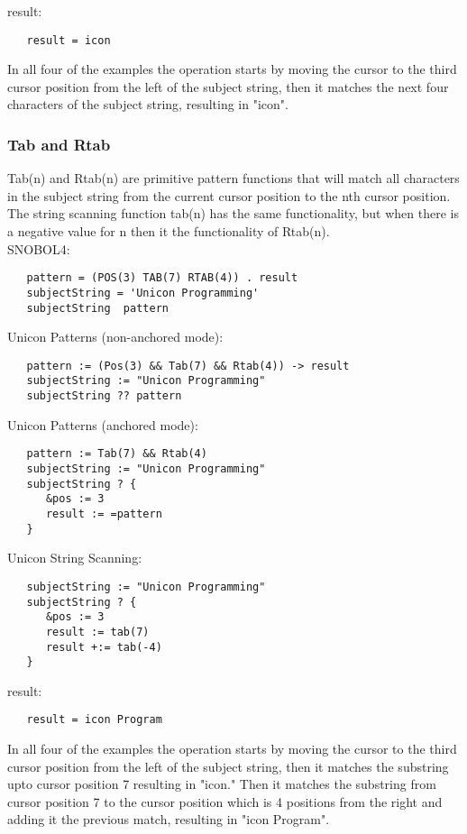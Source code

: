 \documentclass{article}
\begin{document}
\noindent
result:
\begin{verbatim}
   result = icon
\end{verbatim}

In all four of the examples the operation starts by moving the cursor to the third cursor position from the left of the subject string, then it matches the next four characters of the subject string, resulting in "icon".

\vspace{2 pc}
\subsubsection{Tab and Rtab}
Tab(n) and Rtab(n) are primitive pattern functions that will match all characters in the subject string from the current cursor position to the nth cursor position.  The string scanning function tab(n) has the same functionality, but when there is a negative value for n then it the functionality of Rtab(n).\\

\noindent
SNOBOL4:
\begin{verbatim}
   pattern = (POS(3) TAB(7) RTAB(4)) . result
   subjectString = 'Unicon Programming'
   subjectString  pattern
\end{verbatim}

\noindent
Unicon Patterns (non-anchored mode):
\begin{verbatim}
   pattern := (Pos(3) && Tab(7) && Rtab(4)) -> result
   subjectString := "Unicon Programming"
   subjectString ?? pattern
\end{verbatim}
\noindent
Unicon Patterns (anchored mode):
\begin{verbatim}
   pattern := Tab(7) && Rtab(4)
   subjectString := "Unicon Programming"
   subjectString ? {
      &pos := 3
      result := =pattern
   }
\end{verbatim}

\noindent
Unicon String Scanning:
\begin{verbatim}
   subjectString := "Unicon Programming"
   subjectString ? {
      &pos := 3
      result := tab(7)
      result +:= tab(-4)
   }
\end{verbatim}

\noindent
result:
\begin{verbatim}
   result = icon Program
\end{verbatim}

In all four of the examples the operation starts by moving the cursor to the third cursor position from the left of the subject string, then it matches the substring upto cursor position 7 resulting in "icon."  Then it matches the substring from cursor position 7 to the cursor position which is 4 positions from the right and adding it the previous match, resulting in "icon Program".
\end{document}

